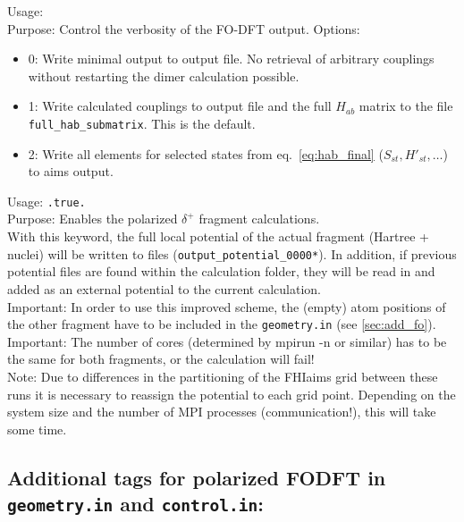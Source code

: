 {
  \noindent
  Usage:  \\[1.0ex]
  Purpose: Control the verbosity of the FO-DFT output. 
  Options: 
  \begin{itemize}
    \item 0: Write minimal output to output file. No retrieval of arbitrary couplings without restarting the dimer calculation possible.
    \item 1: Write calculated couplings to output file and the full $H_{ab}$ matrix to the file \texttt{full\_hab\_submatrix}. This is the default.
    \item 2: Write all elements for selected states from eq.~\ref{eq:hab_final} ($S_{st}, H'_{st}, \ldots$) to aims output.
   \end{itemize}
}

{
  \noindent
  Usage:  \texttt{.true.}\\[1.0ex]
  Purpose: Enables the polarized $\delta^+$ fragment calculations.\\[1.0ex] 

  With this keyword, the full local potential of the actual fragment (Hartree + nuclei) will be written to files (\texttt{output\_potential\_0000*}). In addition, if previous potential files are found within the calculation folder, they will be read in and added as an external potential to the current calculation.\\[1.0ex]
  Important: In order to use this improved scheme, the (empty) atom positions of the other fragment have to be included in the \texttt{geometry.in} (see \ref{sec:add_fo}).\\[1.0ex]
%
  Important: The number of cores (determined by mpirun -n or similar) has to be the same for both fragments, or the calculation will fail!\\[1.0ex]
%
  Note: Due to differences in the partitioning of the FHIaims grid between these runs it is necessary to reassign the potential to each grid point. Depending on the system size and the number of MPI processes (communication!), this will take some time. 
}

\subsection*{Additional tags for polarized FODFT in \texttt{geometry.in} and \texttt{control.in}:}\label{sec:add_fo}

